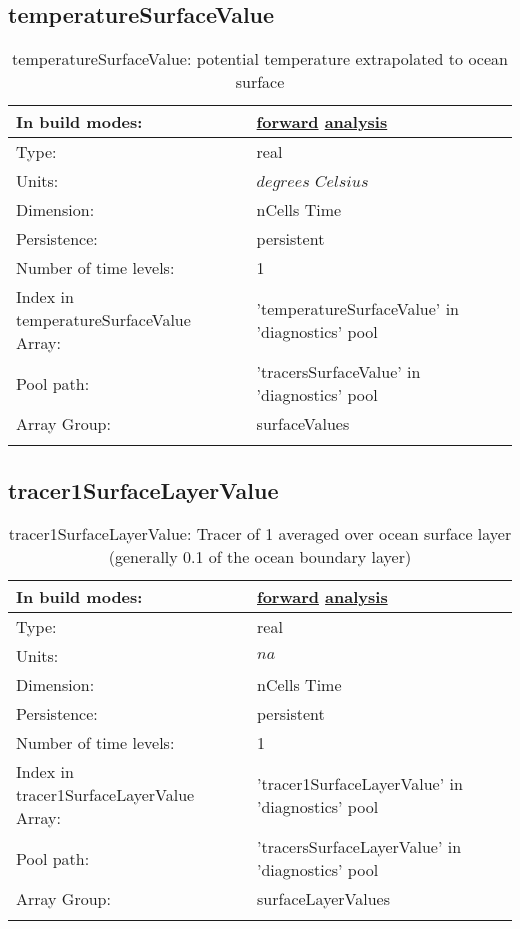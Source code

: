 \subsection[temperatureSurfaceValue]{temperatureSurfaceValue}
\label{subsec:var_sec_diagnostics_temperatureSurfaceValue}
\begin{center}
\begin{longtable}{| p{2.0in} | p{4.0in} |}
        \hline 
        In build modes: & \hyperref[subsec:forward_var_tab_diagnostics]{forward} \hyperref[subsec:analysis_var_tab_diagnostics]{analysis} \\
        \hline 
        Type: & real \\
        \hline 
        Units: & $degrees$ $Celsius$ \\
        \hline 
        Dimension: & nCells Time \\
        \hline 
        Persistence: & persistent \\
        \hline 
        Number of time levels: & 1 \\
        \hline 
		 Index in temperatureSurfaceValue Array: & 'temperatureSurfaceValue' in 'diagnostics' pool \\
		 \hline 
            Pool path: & 'tracersSurfaceValue' in 'diagnostics' pool
 \\
		 \hline 
		 Array Group: & surfaceValues \\
		 \hline 
    \caption{temperatureSurfaceValue: potential temperature extrapolated to ocean surface}
\end{longtable}
\end{center}
\subsection[tracer1SurfaceLayerValue]{tracer1SurfaceLayerValue}
\label{subsec:var_sec_diagnostics_tracer1SurfaceLayerValue}
\begin{center}
\begin{longtable}{| p{2.0in} | p{4.0in} |}
        \hline 
        In build modes: & \hyperref[subsec:forward_var_tab_diagnostics]{forward} \hyperref[subsec:analysis_var_tab_diagnostics]{analysis} \\
        \hline 
        Type: & real \\
        \hline 
        Units: & $na$ \\
        \hline 
        Dimension: & nCells Time \\
        \hline 
        Persistence: & persistent \\
        \hline 
        Number of time levels: & 1 \\
        \hline 
		 Index in tracer1SurfaceLayerValue Array: & 'tracer1SurfaceLayerValue' in 'diagnostics' pool \\
		 \hline 
            Pool path: & 'tracersSurfaceLayerValue' in 'diagnostics' pool
 \\
		 \hline 
		 Array Group: & surfaceLayerValues \\
		 \hline 
    \caption{tracer1SurfaceLayerValue: Tracer of 1 averaged over ocean surface layer (generally 0.1 of the ocean boundary layer)}
\end{longtable}
\end{center}
